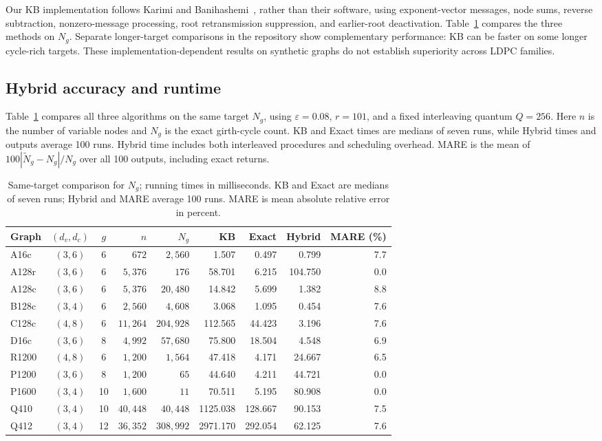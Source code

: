 Our KB implementation follows Karimi and
Banihashemi~\cite{karimi2013}, rather than their
software, using exponent-vector messages,
node sums, reverse subtraction, nonzero-message
processing, root retransmission suppression,
and earlier-root deactivation.
Table~\ref{tab:comparison-exp} compares the three methods on $N_g$.
Separate longer-target comparisons in the repository show complementary
performance: KB can be faster on some longer cycle-rich targets.
These implementation-dependent results on synthetic graphs
do not establish superiority across LDPC families.

\subsection{Hybrid accuracy and runtime}
Table~\ref{tab:comparison-exp} compares all three algorithms on the
same target $N_g$, using $\varepsilon=0.08$, $r=101$, and a fixed
interleaving quantum $Q=256$. Here $n$ is the number of variable
nodes and $N_g$ is the exact girth-cycle count.
KB and Exact times are medians of seven runs, while Hybrid times
and outputs average 100 runs. Hybrid time includes both interleaved
procedures and scheduling overhead. MARE is the mean of
$100|\widetilde N_g-N_g|/N_g$ over all 100 outputs,
including exact returns.

\begin{table}[t]
\centering
\caption{Same-target comparison for $N_g$; running times in milliseconds.
KB and Exact are medians of seven runs; Hybrid and MARE average 100 runs.
MARE is mean absolute relative error in percent.}
\label{tab:comparison-exp}
\footnotesize
\setlength{\tabcolsep}{5pt}
\begin{tabular}{lccrrrrrr}
\hline
Graph & $(d_v,d_c)$ & $g$ & $n$ & $N_g$
& KB & Exact & Hybrid & MARE (\%)\\
\hline
A16c & $(3,6)$ & 6 & $672$ & $2,560$ & 1.507 & 0.497 & 0.799 & 7.7\\
A128r & $(3,6)$ & 6 & $5,376$ & $176$ & 58.701 & 6.215 & 104.750 & 0.0\\
A128c & $(3,6)$ & 6 & $5,376$ & $20,480$ & 14.842 & 5.699 & 1.382 & 8.8\\
B128c & $(3,4)$ & 6 & $2,560$ & $4,608$ & 3.068 & 1.095 & 0.454 & 7.6\\
C128c & $(4,8)$ & 6 & $11,264$ & $204,928$ & 112.565 & 44.423 & 3.196 & 7.6\\
D16c & $(3,6)$ & 8 & $4,992$ & $57,680$ & 75.800 & 18.504 & 4.548 & 6.9\\
R1200 & $(4,8)$ & 6 & $1,200$ & $1,564$ & 47.418 & 4.171 & 24.667 & 6.5\\
P1200 & $(3,6)$ & 8 & $1,200$ & $65$ & 44.640 & 4.211 & 44.721 & 0.0\\
P1600 & $(3,4)$ & 10 & $1,600$ & $11$ & 70.511 & 5.195 & 80.908 & 0.0\\
Q410 & $(3,4)$ & 10 & $40,448$ & $40,448$ & 1125.038 & 128.667 & 90.153 & 7.5\\
Q412 & $(3,4)$ & 12 & $36,352$ & $308,992$ & 2971.170 & 292.054 & 62.125 & 7.6\\
\hline
\end{tabular}
\end{table}

